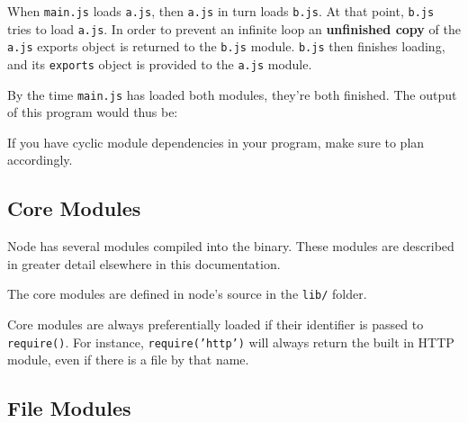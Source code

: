 When \texttt{main.js} loads \texttt{a.js}, then \texttt{a.js} in turn
loads \texttt{b.js}. At that point, \texttt{b.js} tries to load
\texttt{a.js}. In order to prevent an infinite loop an
\textbf{unfinished copy} of the \texttt{a.js} exports object is returned
to the \texttt{b.js} module. \texttt{b.js} then finishes loading, and
its \texttt{exports} object is provided to the \texttt{a.js} module.

By the time \texttt{main.js} has loaded both modules, they're both
finished. The output of this program would thus be:

\begin{Shaded}
\begin{Highlighting}[]
  \NormalTok{= }
  \NormalTok{= }
 \NormalTok{=}\NormalTok{, }\NormalTok{=}
\end{Highlighting}
\end{Shaded}

If you have cyclic module dependencies in your program, make sure to
plan accordingly.

\subsection{Core Modules}\label{core-modules}

Node has several modules compiled into the binary. These modules are
described in greater detail elsewhere in this documentation.

The core modules are defined in node's source in the \texttt{lib/}
folder.

Core modules are always preferentially loaded if their identifier is
passed to \texttt{require()}. For instance, \texttt{require('http')}
will always return the built in HTTP module, even if there is a file by
that name.

\subsection{File Modules}\label{file-modules}

